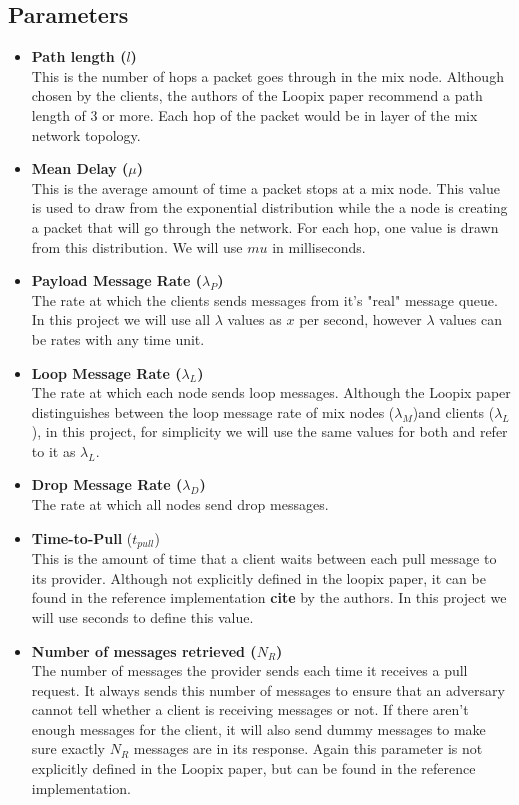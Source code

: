 \documentclass[a4paper,11pt,oneside]{report}
\begin{document}
\subsection{Parameters}
\label{sec:loopix_parameters}

\begin{itemize}
\item \textbf{Path length (\(l\))} \\
This is the number of hops a packet goes through in the mix node. Although chosen by the clients, the authors of the Loopix paper recommend a path length of 3 or more. Each hop of the packet would be in layer of the mix network topology.
\item \textbf{Mean Delay (\(\mu\))} \\
This is the average amount of time a packet stops at a mix node. This value is used to draw from the exponential distribution while the a node is creating a packet that will go through the network. For each hop, one value is drawn from this distribution. We will use \(mu\) in milliseconds.
\item \textbf{Payload Message Rate (\(\lambda_P\))} \\
The rate at which the clients sends messages from it's "real" message queue. In this project we will use all \(\lambda\) values as \(x\) per second, however \(\lambda\) values can be rates with any time unit.
\item \textbf{Loop Message Rate (\(\lambda_L\))} \\ 
The rate at which each node sends loop messages. Although the Loopix paper distinguishes between the loop message rate of mix nodes (\(\lambda_M\))and clients (\(\lambda_L\)), in this project, for simplicity we will use the same values for both and refer to it as \(\lambda_L\).
\item \textbf{Drop Message Rate  (\(\lambda_D\))} \\
The rate at which all nodes send drop messages. 
\item \textbf{Time-to-Pull} (\(t_{pull}\))\\
This is the amount of time that a client waits between each pull message to its provider. Although not explicitly defined in the loopix paper, it can be found in the reference implementation \textbf{cite} by the authors. In this project we will use seconds to define this value.
\item \textbf{Number of messages retrieved (\(N_R\))} \\
The number of messages the provider sends each time it receives a pull request. It always sends this number of messages to ensure that an adversary cannot tell whether a client is receiving messages or not. If there aren't enough messages for the client, it will also send dummy messages to make sure exactly \(N_R\) messages are in its response. Again this parameter is not explicitly defined in the Loopix paper, but can be found in the reference implementation.


\end{itemize}
\end{document}
